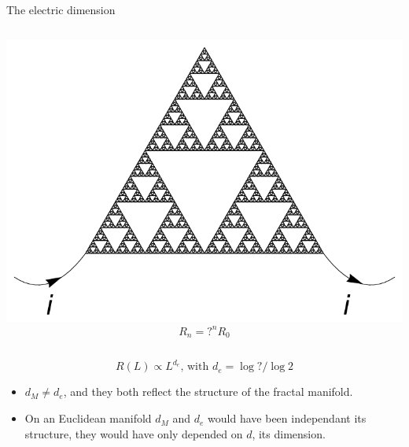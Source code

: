 \documentclass[xcolor=x11names,compress,professionalfonts]{beamer}
\renewcommand{\(}{\begin{columns}}
\renewcommand{\)}{\end{columns}}
\newcommand{\<}[1]{\begin{column}{#1}}
\renewcommand{\>}{\end{column}}
\begin{document}
\begin{frame}{The electric dimension}
\begin{columns}
    \begin{column}{3cm}
    \centering
    \includegraphics[scale=\s]{resInfty.pdf}
    \scriptsize
    \[ R_n= ?^nR_0 \]
  \end{column}
\end{columns}

\[ R(L) \propto L^{d_e} \text{, with } d_e = \log ?/\log 2 \]

\begin{itemize}
	\item $d_M \neq d_e$, and they both reflect the structure of the fractal manifold.
	\item On an Euclidean manifold $d_M$ and $d_e$ would have been independant its structure, they would have only depended on $d$, its dimension.
\end{itemize}

\end{frame}
\end{document}
